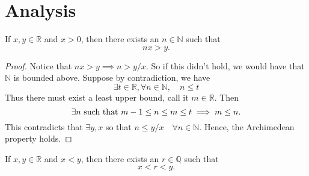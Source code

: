 \documentclass[../main.tex]{subfiles}
\begin{document}
\section{Analysis}










\begin{theorem} \label{thm:archimedean_property} 
    If \( x, y \in \mathbb{R} \) and \( x > 0 \), then there exists an \( n \in \mathbb{N} \) such that
    \[
    nx > y.
    \]
    \end{theorem}
    
    
    
    
    
    \begin{proof}
    Notice that \( nx > y \implies n > y/x \). So if this didn't hold, we would have that $\mathbb{N}$ is bounded above. Suppose by contradiction, we have \[
    \exists t \in \mathbb{R}, \forall n \in \mathbb{N}, \quad n \leq t
    \]
    Thus there must exist a least upper bound, call it $m \in \mathbb{R}$. Then
    \[
    \exists n  \textnormal{ such that }  m - 1 \leq n \leq m \leq t \implies m \leq n.
    \]
    This contradicts that $ \exists y,x$ so that $ n \leq y/x \quad \forall n \in \mathbb{N}$. Hence, the Archimedean property holds.  
    \end{proof}
    
    
    
    
    
    
    
    
    
    
    
    
    
    
    
    
    
    
    
    
    
    
    
    
    
    \begin{theorem} \label{thm:density_of_rationals}
    If \( x, y \in \mathbb{R} \) and \( x < y \), then there exists an \( r \in \mathbb{Q} \) such that
    \[
    x < r < y.
    \]
    \end{theorem}
    
    
    
\end{document}
